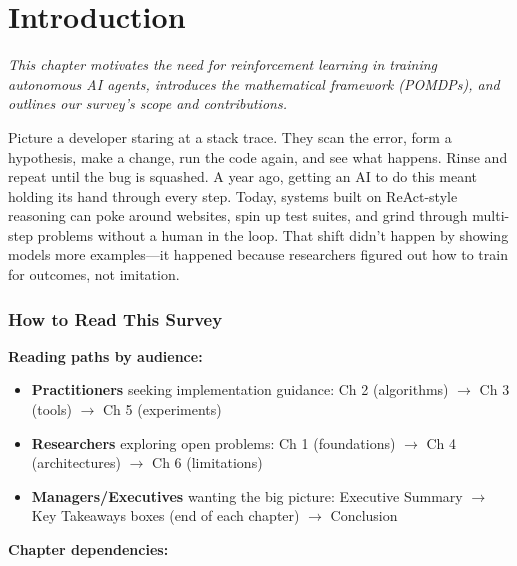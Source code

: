 \documentclass[12pt,a4paper]{report}
\theoremstyle{definition}
\begin{document}

\chapter{Introduction}
\label{ch:introduction}

\textit{This chapter motivates the need for reinforcement learning in training autonomous AI agents, introduces the mathematical framework (POMDPs), and outlines our survey's scope and contributions.}

\vspace{0.3cm}

Picture a developer staring at a stack trace. They scan the error, form a hypothesis, make a change, run the code again, and see what happens. Rinse and repeat until the bug is squashed. A year ago, getting an AI to do this meant holding its hand through every step. Today, systems built on ReAct-style reasoning \cite{yao2023react} can poke around websites, spin up test suites, and grind through multi-step problems without a human in the loop. That shift didn't happen by showing models more examples---it happened because researchers figured out how to train for outcomes, not imitation.

\subsection*{How to Read This Survey}

\textbf{Reading paths by audience:}
\begin{itemize}
    \item \textbf{Practitioners} seeking implementation guidance: Ch 2 (algorithms) $\rightarrow$ Ch 3 (tools) $\rightarrow$ Ch 5 (experiments)
    \item \textbf{Researchers} exploring open problems: Ch 1 (foundations) $\rightarrow$ Ch 4 (architectures) $\rightarrow$ Ch 6 (limitations)
    \item \textbf{Managers/Executives} wanting the big picture: Executive Summary $\rightarrow$ Key Takeaways boxes (end of each chapter) $\rightarrow$ Conclusion
\end{itemize}

\textbf{Chapter dependencies:}
\begin{center}
\end{center}
\end{document}
